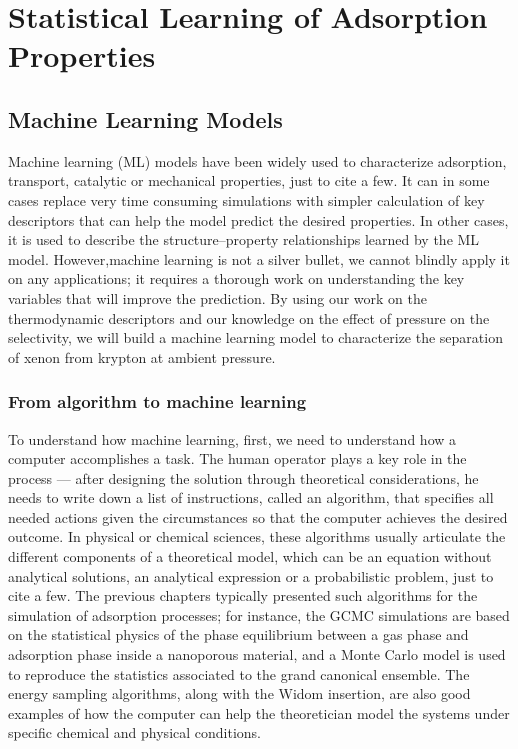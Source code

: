 \documentclass[main]{subfiles}
\begin{document}
\chapter{Statistical Learning of Adsorption Properties}
\vspace*{-1\baselineskip}

\section{Machine Learning Models}

Machine learning (ML) models have been widely used to characterize adsorption, transport, catalytic or mechanical properties, just to cite a few. It can in some cases replace very time consuming simulations with simpler calculation of key descriptors that can help the model predict the desired properties. In other cases, it is used to describe the structure--property relationships learned by the ML model. However,machine learning is not a silver bullet, we cannot blindly apply it on any applications; it requires a thorough work on understanding the key variables that will improve the prediction. By using our work on the thermodynamic descriptors and our knowledge on the effect of pressure on the selectivity, we will build a machine learning model to characterize the separation of xenon from krypton at ambient pressure.

\subsection{From algorithm to machine learning}

To understand how machine learning, first, we need to understand how a computer accomplishes a task. The human operator plays a key role in the process --- after designing the solution through theoretical considerations, he needs to write down a list of instructions, called an algorithm, that specifies all needed actions given the circumstances so that the computer achieves the desired outcome. In physical or chemical sciences, these algorithms usually articulate the different components of a theoretical model, which can be an equation without analytical solutions, an analytical expression or a probabilistic problem, just to cite a few. The previous chapters typically presented such algorithms for the simulation of adsorption processes; for instance, the GCMC simulations are based on the statistical physics of the phase equilibrium between a gas phase and adsorption phase inside a nanoporous material, and a Monte Carlo model is used to reproduce the statistics associated to the grand canonical ensemble. The energy sampling algorithms, along with the Widom insertion, are also good examples of how the computer can help the theoretician model the systems under specific chemical and physical conditions. 
\end{document}
